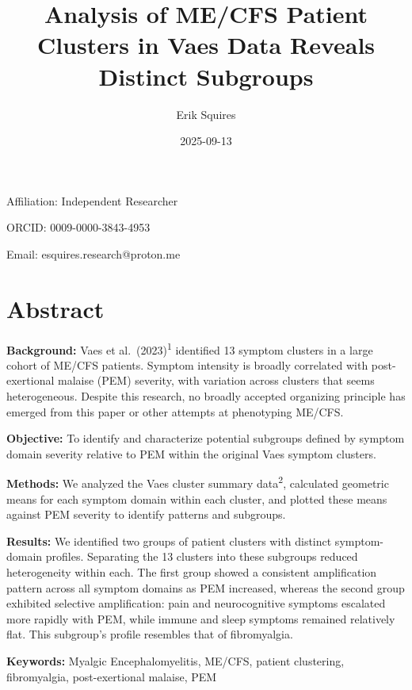 \documentclass[
  letterpaper,
  DIV=11,
  numbers=noendperiod]{scrartcl}
\title{Analysis of ME/CFS Patient Clusters in Vaes Data Reveals Distinct
Subgroups}
\author{Erik Squires}
\date{2025-09-13}
\begin{document}
\maketitle


Affiliation: Independent Researcher

ORCID: 0009-0000-3843-4953

Email: esquires.research@proton.me

\section*{Abstract}\label{abstract}

\textbf{Background:} Vaes et al.~(2023)\textsuperscript{1} identified 13
symptom clusters in a large cohort of ME/CFS patients. Symptom intensity
is broadly correlated with post-exertional malaise (PEM) severity, with
variation across clusters that seems heterogeneous. Despite this
research, no broadly accepted organizing principle has emerged from this
paper or other attempts at phenotyping ME/CFS.

\textbf{Objective:} To identify and characterize potential subgroups
defined by symptom domain severity relative to PEM within the original
Vaes symptom clusters.

\textbf{Methods:} We analyzed the Vaes cluster summary
data\textsuperscript{2}, calculated geometric means for each symptom
domain within each cluster, and plotted these means against PEM severity
to identify patterns and subgroups.

\textbf{Results:} We identified two groups of patient clusters with
distinct symptom-domain profiles. Separating the 13 clusters into these
subgroups reduced heterogeneity within each. The first group showed a
consistent amplification pattern across all symptom domains as PEM
increased, whereas the second group exhibited selective amplification:
pain and neurocognitive symptoms escalated more rapidly with PEM, while
immune and sleep symptoms remained relatively flat. This subgroup's
profile resembles that of fibromyalgia.

\textbf{Keywords:} Myalgic Encephalomyelitis, ME/CFS, patient
clustering, fibromyalgia, post-exertional malaise, PEM

\newpage{}

\tableofcontents

\newpage{}

\listoffigures
\listoftables

\newpage{}
\end{document}
